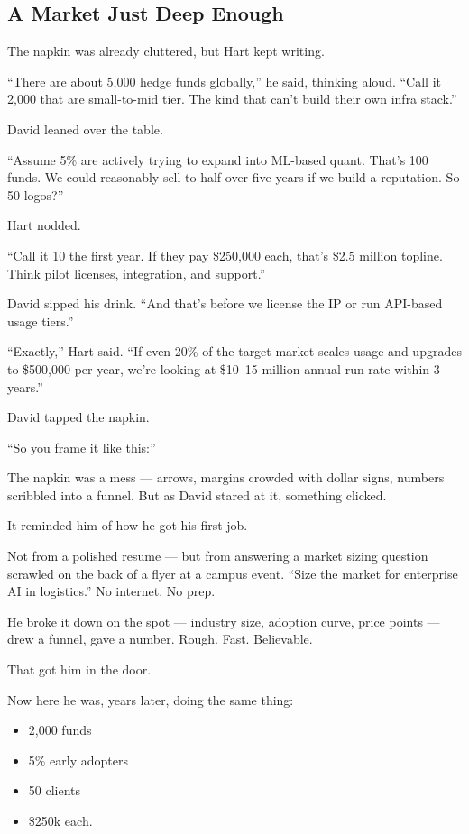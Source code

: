 
\subsection{A Market Just Deep Enough}

The napkin was already cluttered, but Hart kept writing.

``There are about 5{,}000 hedge funds globally,'' he said, thinking aloud. ``Call it 2{,}000 
that are small-to-mid tier. The kind that can’t build their own infra stack.''

David leaned over the table.

``Assume 5\% are actively trying to expand into ML-based quant. That’s 100 funds.  
We could reasonably sell to half over five years if we build a reputation. So 50 logos?''

Hart nodded.

``Call it 10 the first year. If they pay \$250{,}000 each, that’s \$2.5 million topline.  
Think pilot licenses, integration, and support.''

David sipped his drink. ``And that’s before we license the IP or run API-based usage tiers.''

``Exactly,'' Hart said. ``If even 20\% of the target market scales usage and upgrades to \$500{,}000 per year,  
we’re looking at \$10–15 million annual run rate within 3 years.''

David tapped the napkin.

``So you frame it like this:''

The napkin was a mess — arrows, margins crowded with dollar signs, numbers scribbled into a funnel. But as David 
stared at it, something clicked.

It reminded him of how he got his first job.

Not from a polished resume — but from answering a market sizing question scrawled on the back of a flyer at a campus event.
“Size the market for enterprise AI in logistics.” No internet. No prep.

He broke it down on the spot — industry size, adoption curve, price points — drew a funnel, gave a number.
Rough. Fast. Believable.

That got him in the door.

Now here he was, years later, doing the same thing:
\begin{itemize}
    \item 2,000 funds 
    \item 5\% early adopters 
    \item 50 clients 
    \item \$250k each.
\end{itemize}

